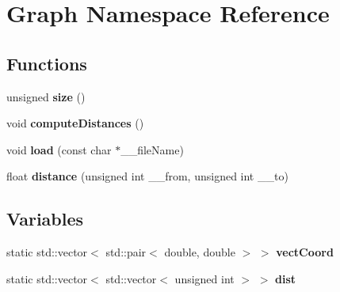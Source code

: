 \section{Graph Namespace Reference}
\label{namespace_graph}


\subsection*{Functions}
\begin{CompactItemize}
\item 
unsigned {\bf size} ()\label{namespace_graph_28d00fd97d57e79738e7df7ba8214f5c}

\item 
void {\bf computeDistances} ()\label{namespace_graph_517d15215e1529a6585e15949f29c326}

\item 
void {\bf load} (const char $\ast$\_\-\_\-fileName)\label{namespace_graph_95f0bc08fa93f8f4abf1801674488b30}

\item 
float {\bf distance} (unsigned int \_\-\_\-from, unsigned int \_\-\_\-to)\label{namespace_graph_510a8b9e849ec2c3241a09cac9d45cc6}

\end{CompactItemize}
\subsection*{Variables}
\begin{CompactItemize}
\item 
static std::vector$<$ std::pair$<$ double, double $>$ $>$ {\bf vectCoord}\label{namespace_graph_4199f2387f0cda6c75804c94b635e24c}

\item 
static std::vector$<$ std::vector$<$ unsigned int $>$ $>$ {\bf dist}\label{namespace_graph_c1316f71ab101e1f63eecd81a8d7a400}

\end{CompactItemize}
